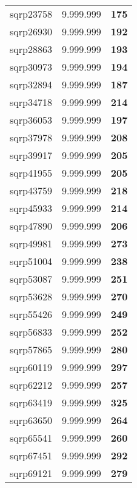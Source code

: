 \begin{tabular}{cc||c}
sqrp23758        & 9.999.999        & {\bf 175}       \\ 
sqrp26930        & 9.999.999        & {\bf 192}       \\ 
sqrp28863        & 9.999.999        & {\bf 193}       \\ 
sqrp30973        & 9.999.999        & {\bf 194}       \\ 
sqrp32894        & 9.999.999        & {\bf 187}       \\ 
sqrp34718        & 9.999.999        & {\bf 214}       \\ 
sqrp36053        & 9.999.999        & {\bf 197}       \\ 
sqrp37978        & 9.999.999        & {\bf 208}       \\ 
sqrp39917        & 9.999.999        & {\bf 205}       \\ 
sqrp41955        & 9.999.999        & {\bf 205}       \\ 
sqrp43759        & 9.999.999        & {\bf 218}       \\ 
sqrp45933        & 9.999.999        & {\bf 214}       \\ 
sqrp47890        & 9.999.999        & {\bf 206}       \\ 
sqrp49981        & 9.999.999        & {\bf 273}       \\ 
sqrp51004        & 9.999.999        & {\bf 238}       \\ 
sqrp53087        & 9.999.999        & {\bf 251}       \\ 
sqrp53628        & 9.999.999        & {\bf 270}       \\ 
sqrp55426        & 9.999.999        & {\bf 249}       \\ 
sqrp56833        & 9.999.999        & {\bf 252}       \\ 
sqrp57865        & 9.999.999        & {\bf 280}       \\ 
sqrp60119        & 9.999.999        & {\bf 297}       \\ 
sqrp62212        & 9.999.999        & {\bf 257}       \\ 
sqrp63419        & 9.999.999        & {\bf 325}       \\ 
sqrp63650        & 9.999.999        & {\bf 264}       \\ 
sqrp65541        & 9.999.999        & {\bf 260}       \\ 
sqrp67451        & 9.999.999        & {\bf 292}       \\ 
sqrp69121        & 9.999.999        & {\bf 279}       \\ 

\end{tabular}
